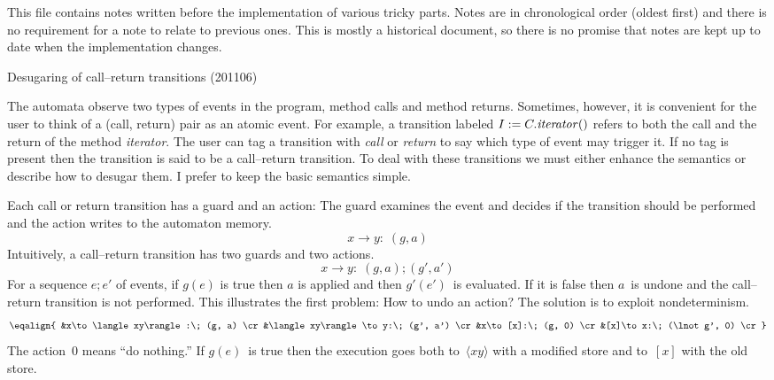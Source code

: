 \def\para #1.{\noindent{\it#1.\enspace}}

This file contains notes written before the implementation of various tricky parts.
Notes are in chronological order (oldest first) and there is no requirement for a note to relate to previous ones.
This is mostly a historical document, so there is no promise that notes are kept up to date when the implementation changes.

\beginsection Desugaring of call--return transitions (201106) %

\para Background.
The automata observe two types of events in the program, method calls and method returns.
Sometimes, however, it is convenient for the user to think of a (call, return) pair as an atomic event.
For example, a transition labeled $I:=C.{\it iterator}()$ refers to both the call and the return of the method {\it iterator}.
The user can tag a transition with {\it call\/} or {\it return\/} to say which type of event may trigger it.
If no tag is present then the transition is said to be a call--return transition.
To deal with these transitions we must either enhance the semantics or describe how to desugar them.
I prefer to keep the basic semantics simple.

Each call or return transition has a guard and an action:
The guard examines the event and decides if the transition should be performed and the action writes to the automaton memory.
$$x\to y:\; (g, a)$$
Intuitively, a call--return transition has two guards and two actions.
$$x\to y:\; (g,a); (g',a')$$
For a sequence $e;e'$ of events, if $g(e)$ is true then $a$ is applied and then $g'(e')$~is evaluated.
If it is false then $a$~is undone and the call--return transition is not performed.
This illustrates the first problem:
How to undo an action?
The solution is to exploit nondeterminism.
$$\eqalign{
&x\to\langle xy\rangle:\; (g, a) \cr
&\langle xy\rangle\to y:\; (g', a') \cr
&x\to[x]:\; (g, 0) \cr
&[x]\to x:\; (\lnot g', 0) \cr
}$$
The action~$0$ means ``do nothing.''
If $g(e)$~is true then the execution goes both to~$\langle xy\rangle$ with a modified store and to~$[x]$ with the old store.

